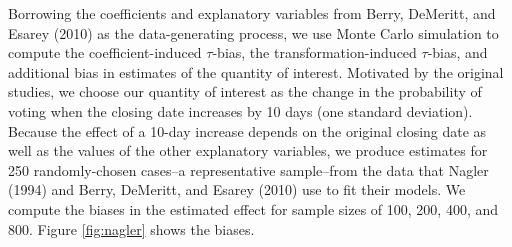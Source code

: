 \documentclass[11pt]{article}
\begin{document}

Borrowing the coefficients and explanatory variables from Berry, DeMeritt, and Esarey (2010) as the data-generating process, we use Monte Carlo simulation to compute the coefficient-induced $\tau$-bias, the transformation-induced $\tau$-bias, and additional bias in estimates of the quantity of interest. 
Motivated by the original studies, we choose our quantity of interest as the change in the probability of voting when the closing date increases by 10 days (one standard deviation).
Because the effect of a 10-day increase depends on the original closing date as well as the values of the other explanatory variables, we produce estimates for 250 randomly-chosen cases--a representative sample--from the data that Nagler (1994) and Berry, DeMeritt, and Esarey (2010) use to fit their models.
We compute the biases in the estimated effect for sample sizes of 100, 200, 400, and 800. 
Figure \ref{fig:nagler} shows the biases.
\end{document}
